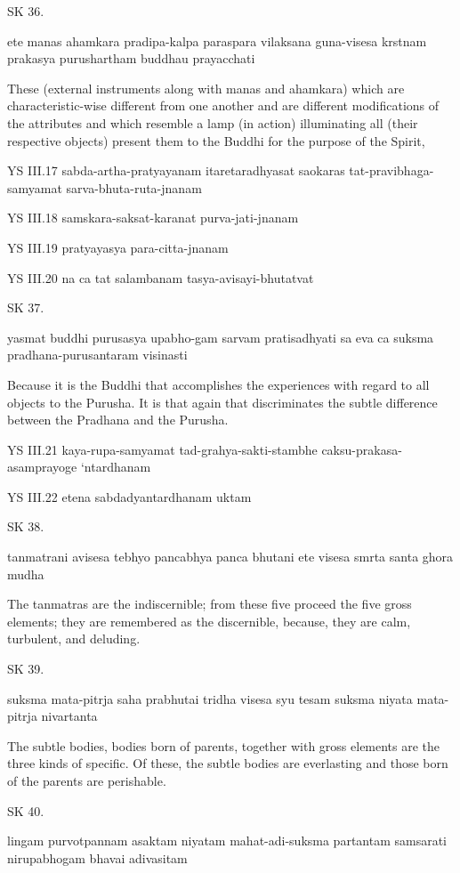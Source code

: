 SK 36.

ete manas ahamkara pradipa-kalpa paraspara vilaksana
guna-visesa krstnam prakasya purushartham buddhau prayacchati

These (external instruments along with manas and ahamkara)
which are characteristic-wise different from one another 
and are different modifications of the attributes
and which resemble a lamp (in action) illuminating all (their respective objects)
present them to the Buddhi for the purpose of the Spirit, 

YS III.17
    sabda-artha-pratyayanam itaretaradhyasat saokaras tat-pravibhaga-samyamat sarva-bhuta-ruta-jnanam

YS III.18
    samskara-saksat-karanat purva-jati-jnanam

YS III.19
    pratyayasya para-citta-jnanam

YS III.20
    na ca tat salambanam tasya-avisayi-bhutatvat

SK 37.

yasmat buddhi purusasya upabho-gam sarvam pratisadhyati 
sa eva ca suksma pradhana-purusantaram visinasti

Because it is the Buddhi that accomplishes the experiences
with regard to all objects to the Purusha.
It is that again that discriminates the subtle difference
between the Pradhana and the Purusha.

YS III.21
    kaya-rupa-samyamat tad-grahya-sakti-stambhe caksu-prakasa-asamprayoge ‘ntardhanam

YS III.22
    etena sabdadyantardhanam uktam

SK 38.

tanmatrani avisesa tebhyo pancabhya panca bhutani
ete visesa smrta santa ghora mudha

The tanmatras are the indiscernible;
from these five proceed the five gross elements;
they are remembered as the discernible,
because, they are calm, turbulent, and deluding.

SK 39.

suksma mata-pitrja saha prabhutai tridha visesa syu 
tesam  suksma niyata mata-pitrja nivartanta

The subtle bodies, bodies born of parents, together
with gross elements are the three kinds of specific.
Of these, the subtle bodies are everlasting and
those born of the parents are perishable.

SK 40.

lingam purvotpannam asaktam niyatam mahat-adi-suksma
partantam samsarati nirupabhogam bhavai adivasitam

